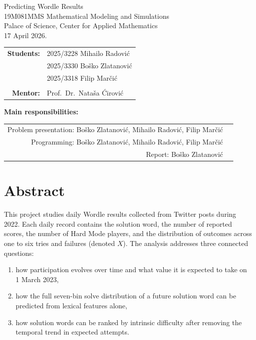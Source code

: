 \documentclass{article}
\begin{document}
\begin{center}
	{\huge Predicting Wordle Results} \\
		\vspace*{3mm}
		{\large 19M081MMS Mathematical Modeling and Simulations \\
		Palace of Science, Center for Applied Mathematics \\
		\vspace*{3mm}
		17 April 2026. }
\end{center}

\vspace*{10mm}

\begin{tabular}{r l}
\textbf{Students:} &  2025/3228 Mihailo Radović \\
				&	2025/3330 Boško Zlatanović \\
				&	2025/3318 Filip Marčić \\
				&   \\
\textbf{Mentor:} & Prof.~Dr.~Nataša Ćirović
\end{tabular}

\vspace*{5mm}
\textbf{Main responsibilities:}
\vspace*{3mm}

\begin{tabular}{r l}
	Problem presentation:  Boško Zlatanović, Mihailo Radović, Filip Marčić&  \\
	Programming: Boško Zlatanović, Mihailo Radović, Filip Marčić	\\
	Report:	Boško Zlatanović
\end{tabular}

\vspace*{15mm}

\section{Abstract}

This project studies daily Wordle results collected from Twitter posts during
2022. Each daily record contains the solution word, the number of reported
scores, the number of Hard Mode players, and the distribution of outcomes across
one to six tries and failures (denoted $X$). The analysis addresses three
connected questions:

\begin{enumerate}[label=\arabic*)]
  \item how participation evolves over time and what value it is expected to take
        on 1 March 2023,
  \item how the full seven-bin solve distribution of a future solution word can
        be predicted from lexical features alone,
  \item how solution words can be ranked by intrinsic difficulty after removing
        the temporal trend in expected attempts.
\end{enumerate}
\end{document}
